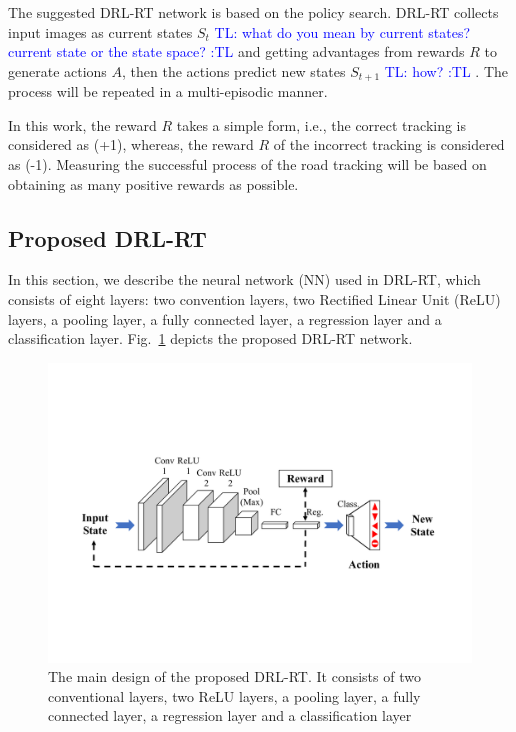 \documentclass{svproc}
\newcommand{\tl}[1]{\textcolor{blue} {TL: #1 :TL} }
\begin{document}
The suggested DRL-RT network is based on the policy search. %
DRL-RT collects input images as current states $S_t$ \tl{what do you mean by current states? current state or the state space?} and getting advantages from rewards $R$ to generate actions $A$, then the actions predict new states $S_{t+1}$ \tl{how?}. The process will be repeated in a multi-episodic manner. %


In this work, the reward $R$ takes a simple form, i.e., the correct tracking is considered as (+1), whereas, the reward $R$ of the incorrect tracking is considered as (-1). Measuring the successful process of the road tracking will be based on obtaining as many positive rewards as possible. 

\subsection{Proposed DRL-RT} 
In this section, we describe the neural network (NN) used in DRL-RT, which consists of eight layers: two convention layers, two Rectified Linear Unit (ReLU) layers, a pooling layer, a fully connected layer, a regression layer and a classification layer. Fig.~\ref{Fig:Deep_Reinf_Net} depicts the proposed DRL-RT network.

\begin{figure}[!h]
	\centering
	\includegraphics[scale=.5,trim=2cm 5.5cm 2cm 5.5cm,clip]{Deep_Reinf_Net1.pdf}
	\caption{The main design of the proposed DRL-RT. It consists of two conventional layers, two ReLU layers, a pooling layer, a fully connected layer, a regression layer and a classification layer}
	\label{Fig:Deep_Reinf_Net}
\end{figure}
\end{document}
